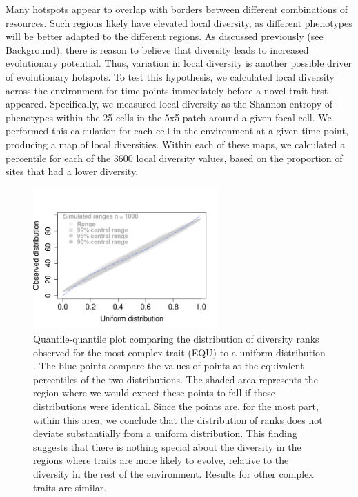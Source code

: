 Many hotspots appear to overlap with borders between different combinations of resources. Such regions likely have elevated local diversity, as different phenotypes will be better adapted to the different regions. As discussed previously (see Background), there is reason to believe that diversity leads to increased evolutionary potential. Thus, variation in local diversity is another possible driver of evolutionary hotspots. To test this hypothesis, we calculated local diversity across the environment for time points immediately before a novel trait first appeared. Specifically, we measured local diversity as the Shannon entropy of phenotypes within the 25 cells in the 5x5 patch around a given focal cell. We performed this calculation for each cell in the environment at a given time point, producing a map of local diversities. Within each of these maps, we calculated a percentile for each of the 3600 local diversity values, based on the proportion of sites that had a lower diversity.

\begin{figure}[t]
\begin{center}
\includegraphics[width=2.8in]{figs/localdiversity.png}
\caption{Quantile-quantile plot comparing the distribution of diversity ranks observed for the most complex trait (EQU) to a uniform distribution \citep{oldford_qqtest:_2016}. The blue points compare the values of points at the equivalent percentiles of the two distributions. The shaded area represents the region where we would expect these points to fall if these distributions were identical. Since the points are, for the most part, within this area, we conclude that the distribution of ranks does not deviate substantially from a uniform distribution. This finding suggests that there is nothing special about the diversity in the regions where traits are more likely to evolve, relative to the diversity in the rest of the environment. Results for other complex traits are similar.}
\label{diversity}
\end{center}
\end{figure}

